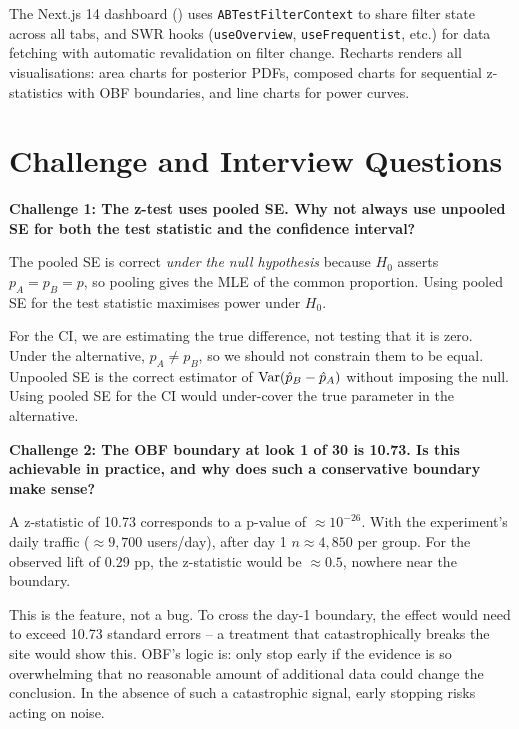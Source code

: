 The Next.js 14 dashboard ()
uses \texttt{ABTestFilterContext} to share filter state across all tabs, and SWR
hooks (\texttt{useOverview}, \texttt{useFrequentist}, etc.) for data fetching
with automatic revalidation on filter change. Recharts renders all
visualisations: area charts for posterior PDFs, composed charts for sequential
z-statistics with OBF boundaries, and line charts for power curves.

\section{Challenge and Interview Questions}
\label{sec:abtest-questions}

\begin{challengebox}
  \textbf{Challenge 1: The z-test uses pooled SE. Why not always use unpooled SE
  for both the test statistic and the confidence interval?}

  The pooled SE is correct \emph{under the null hypothesis} because $H_0$
  asserts $p_A = p_B = p$, so pooling gives the MLE of the common proportion.
  Using pooled SE for the test statistic maximises power under $H_0$.

  For the CI, we are estimating the true difference, not testing that it is
  zero. Under the alternative, $p_A \neq p_B$, so we should not constrain them
  to be equal. Unpooled SE is the correct estimator of
  $\operatorname{Var}(\hat{p}_B - \hat{p}_A)$ without imposing the null. Using pooled SE for
  the CI would under-cover the true parameter in the alternative.
\end{challengebox}

\begin{challengebox}
  \textbf{Challenge 2: The OBF boundary at look 1 of 30 is 10.73. Is this
  achievable in practice, and why does such a conservative boundary make sense?}

  A z-statistic of 10.73 corresponds to a p-value of $\approx 10^{-26}$.
  With the experiment's daily traffic ($\approx 9{,}700$ users/day), after day 1
  $n \approx 4{,}850$ per group. For the observed lift of 0.29 pp, the
  z-statistic would be $\approx 0.5$, nowhere near the boundary.

  This is the feature, not a bug. To cross the day-1 boundary, the effect would
  need to exceed 10.73 standard errors -- a treatment that catastrophically
  breaks the site would show this. OBF's logic is: only stop early if the
  evidence is so overwhelming that no reasonable amount of additional data
  could change the conclusion. In the absence of such a catastrophic signal,
  early stopping risks acting on noise.
\end{challengebox}

